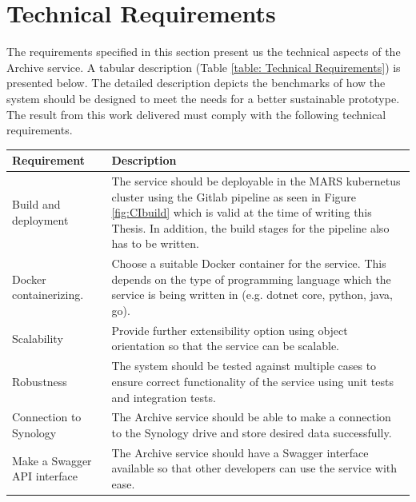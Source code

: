 \section{Technical Requirements}
\label{section:technicalReq}
The requirements specified in this section present us the technical aspects of the Archive service. A tabular description 
(Table \ref{table: Technical Requirements}) is presented below.
The detailed description depicts the benchmarks of how the system should be designed to meet the needs for a better sustainable prototype.
The result from this work delivered must comply with the following technical requirements.

    \begin{table}[h!]
        \centering
        \begin{tabular}{|p{3cm}|p{12cm}|}
            \hline
                \textbf{Requirement}  & \textbf{Description}\\
            \hline
                 Build and deployment & 
                 The service should be deployable in the MARS kubernetus \cite{kubernetes} cluster using the Gitlab pipeline as seen in Figure \ref{fig:CIbuild}
                 which is valid at the time of writing this Thesis. In addition,
                 the build stages for the pipeline also has to be written. \\
            \hline
                Docker containerizing.
                & Choose a suitable Docker container \cite[p.~7 - 8]{Torre2017} for the service. This depends on the type of programming language which 
                the service is being
                written in (e.g. dotnet core, python, java, go).\\
            \hline
                 Scalability & Provide further extensibility option using object orientation so that the service can be scalable.\\
            \hline
                 Robustness & The system should be tested against multiple cases to ensure correct functionality of the service using unit tests and
                 integration tests.\\    
            \hline
                 Connection to Synology & The Archive service should be able to make a connection to the Synology drive and store desired data successfully.\\ 
            \hline
                 Make a Swagger API interface & The Archive service should have a Swagger \cite{swagger} interface available so that other 
                 developers can use the service with ease.\\         

\end{tabular}
\end{table}
